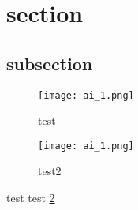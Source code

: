 \documentclass{article}
\begin{document}
\section{section}
\subsection{subsection}


\begin{figure}[H]
	\centering
	\texttt{[image: ai\_1.png]}
	\caption{test}
	\label{testlabel}
\end{figure}

\begin{figure}[H]
	\centering
	\texttt{[image: ai\_1.png]}
	\caption{test2}
	\label{testlabel2}
\end{figure}

test test \ref{testlabel2}
\end{document}
